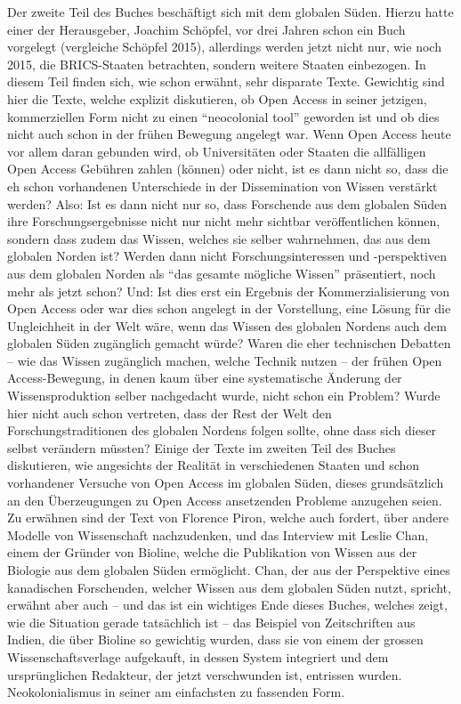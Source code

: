 \documentclass[a4paper,
fontsize=11pt,
oneside,
numbers=noperiodatend,
parskip=half-,
bibliography=totoc,
final
]{scrartcl}
\begin{document}
Der zweite Teil des Buches beschäftigt sich mit dem globalen Süden.
Hierzu hatte einer der Herausgeber, Joachim Schöpfel, vor drei Jahren
schon ein Buch vorgelegt (vergleiche Schöpfel 2015), allerdings werden
jetzt nicht nur, wie noch 2015, die BRICS-Staaten betrachten, sondern
weitere Staaten einbezogen. In diesem Teil finden sich, wie schon
erwähnt, sehr disparate Texte. Gewichtig sind hier die Texte, welche
explizit diskutieren, ob Open Access in seiner jetzigen, kommerziellen
Form nicht zu einen \enquote{neocolonial tool} geworden ist und ob dies
nicht auch schon in der frühen Bewegung angelegt war. Wenn Open Access
heute vor allem daran gebunden wird, ob Universitäten oder Staaten die
allfälligen Open Access Gebühren zahlen (können) oder nicht, ist es dann
nicht so, dass die eh schon vorhandenen Unterschiede in der
Dissemination von Wissen verstärkt werden? Also: Ist es dann nicht nur
so, dass Forschende aus dem globalen Süden ihre Forschungsergebnisse
nicht nur nicht mehr sichtbar veröffentlichen können, sondern dass zudem
das Wissen, welches sie selber wahrnehmen, das aus dem globalen Norden
ist? Werden dann nicht Forschungsinteressen und -perspektiven aus dem
globalen Norden als \enquote{das gesamte mögliche Wissen} präsentiert,
noch mehr als jetzt schon? Und: Ist dies erst ein Ergebnis der
Kommerzialisierung von Open Access oder war dies schon angelegt in der
Vorstellung, eine Lösung für die Ungleichheit in der Welt wäre, wenn das
Wissen des globalen Nordens auch dem globalen Süden zugänglich gemacht
würde? Waren die eher technischen Debatten -- wie das Wissen zugänglich
machen, welche Technik nutzen -- der frühen Open Access-Bewegung, in
denen kaum über eine systematische Änderung der Wissensproduktion selber
nachgedacht wurde, nicht schon ein Problem? Wurde hier nicht auch schon
vertreten, dass der Rest der Welt den Forschungstraditionen des globalen
Nordens folgen sollte, ohne dass sich dieser selbst verändern müssten?
Einige der Texte im zweiten Teil des Buches diskutieren, wie angesichts
der Realität in verschiedenen Staaten und schon vorhandener Versuche von
Open Access im globalen Süden, dieses grundsätzlich an den Überzeugungen
zu Open Access ansetzenden Probleme anzugehen seien. Zu erwähnen sind
der Text von Florence Piron, welche auch fordert, über andere Modelle
von Wissenschaft nachzudenken, und das Interview mit Leslie Chan, einem
der Gründer von Bioline, welche die Publikation von Wissen aus der
Biologie aus dem globalen Süden ermöglicht. Chan, der aus der
Perspektive eines kanadischen Forschenden, welcher Wissen aus dem
globalen Süden nutzt, spricht, erwähnt aber auch -- und das ist ein
wichtiges Ende dieses Buches, welches zeigt, wie die Situation gerade
tatsächlich ist -- das Beispiel von Zeitschriften aus Indien, die über
Bioline so gewichtig wurden, dass sie von einem der grossen
Wissenschaftsverlage aufgekauft, in dessen System integriert und dem
ursprünglichen Redakteur, der jetzt verschwunden ist, entrissen wurden.
Neokolonialismus in seiner am einfachsten zu fassenden Form.
\end{document}
